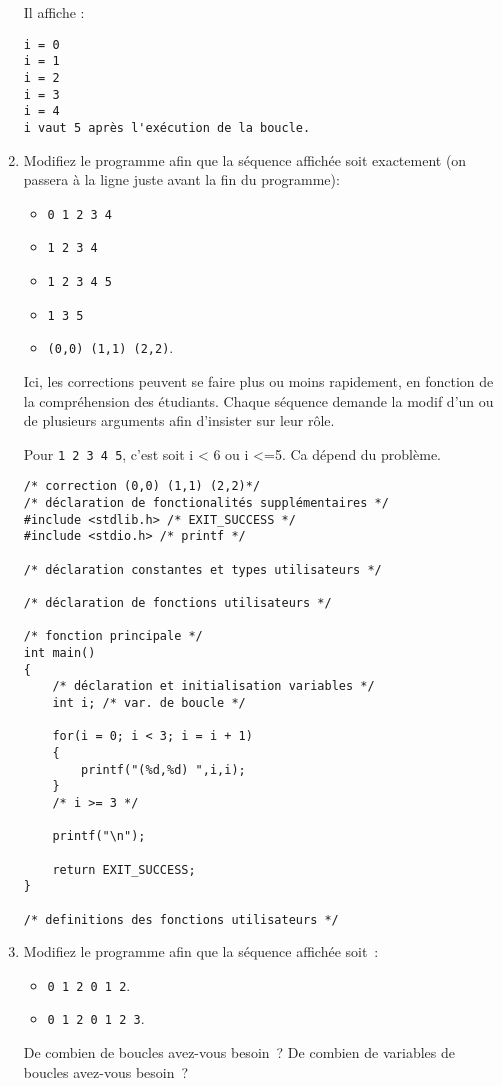 \begin{enumerate}
\begin{correction}
Il affiche :
\begin{verbatim}
i = 0
i = 1
i = 2
i = 3
i = 4
i vaut 5 après l'exécution de la boucle.
\end{verbatim}
\end{correction}
\item Modifiez le programme afin que la séquence affichée soit exactement (on passera à la ligne juste avant la fin du programme):
  \begin{itemize}
  \item \verb|0 1 2 3 4|
  \item \verb|1 2 3 4|
  \item \verb|1 2 3 4 5|
  \item \verb|1 3 5|
  \item \verb|(0,0) (1,1) (2,2)|.
  \end{itemize}
  \begin{correction}
    Ici, les corrections peuvent se faire plus ou moins rapidement, en
    fonction de la compréhension des étudiants. Chaque séquence
    demande la modif d'un ou de plusieurs arguments afin d'insister
    sur leur rôle. 

Pour \verb|1 2 3 4 5|, c'est soit i < 6 ou i <=5. Ca dépend du problème.
\begin{verbatim}
/* correction (0,0) (1,1) (2,2)*/
/* déclaration de fonctionalités supplémentaires */
#include <stdlib.h> /* EXIT_SUCCESS */
#include <stdio.h> /* printf */

/* déclaration constantes et types utilisateurs */

/* déclaration de fonctions utilisateurs */

/* fonction principale */
int main()
{
    /* déclaration et initialisation variables */
    int i; /* var. de boucle */

    for(i = 0; i < 3; i = i + 1)
    {
        printf("(%d,%d) ",i,i);
    }
    /* i >= 3 */

    printf("\n");

    return EXIT_SUCCESS;
}

/* definitions des fonctions utilisateurs */
\end{verbatim}

  \end{correction}
\item Modifiez le programme afin que la séquence affichée soit~:
  \begin{itemize}
  \item \verb|0 1 2 0 1 2|.
  \item \verb|0 1 2 0 1 2 3|.
  \end{itemize}
  De combien de boucles avez-vous besoin~? De combien de variables de
  boucles avez-vous besoin~?


\end{enumerate}
